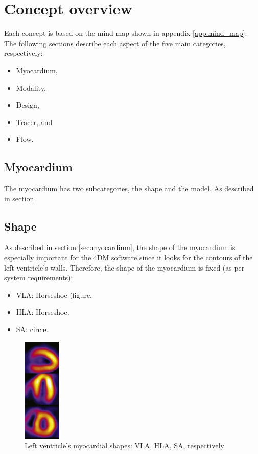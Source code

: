 \section{Concept overview}
Each concept is based on the mind map shown in appendix \ref{app:mind_map}. The following sections describe each aspect of the five main categories, respectively:
\begin{itemize}[noitemsep]
	\item Myocardium,
	\item Modality,
	\item Design,
	\item Tracer, and
	\item Flow.
\end{itemize}
\subsection{Myocardium}
The myocardium has two subcategories, the shape and the model. As described in section 
\subsection*{Shape}
As described in section \ref{sec:myocardium}, the shape of the myocardium is especially important for the 4DM software since it looks for the contours of the left ventricle's walls. Therefore, the shape of the myocardium is fixed (as per system requirements):

\begin{center}
\begin{minipage}{0.3\textwidth}
\begin{itemize}
	\item \ac{VLA}: Horseshoe (figure.
	\item \ac{HLA}: Horseshoe.
	\item \ac{SA}: circle.
\end{itemize}
\end{minipage}%
\begin{minipage}{0.3\textwidth}
\begin{figure}[H]
	\includegraphics[height=5cm]{./images/stacked_shapes.jpg}
	\caption{Left ventricle's myocardial shapes: VLA, HLA, SA, respectively \citep{niwaz2015pres}}
	\label{fig:ventr_shape}
\end{figure}
\end{minipage}
\end{center}
